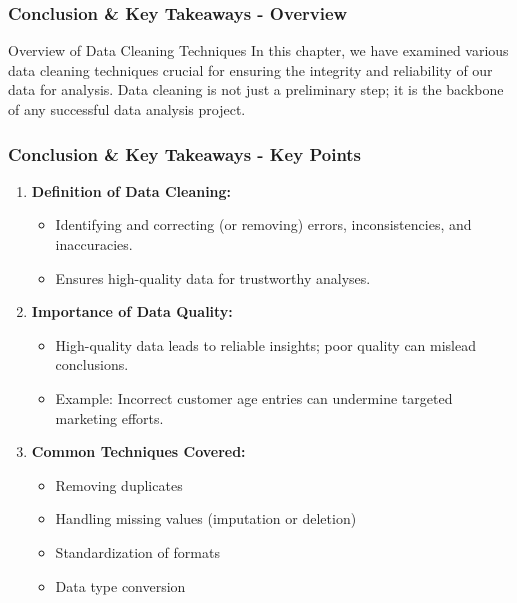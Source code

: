 \documentclass[aspectratio=169]{beamer}
\begin{document}
\begin{frame}[fragile]
    \frametitle{Conclusion \& Key Takeaways - Overview}
    \begin{block}{Overview of Data Cleaning Techniques}
        In this chapter, we have examined various data cleaning techniques crucial for ensuring the integrity and reliability of our data for analysis. Data cleaning is not just a preliminary step; it is the backbone of any successful data analysis project.
    \end{block}
\end{frame}

\begin{frame}[fragile]
    \frametitle{Conclusion \& Key Takeaways - Key Points}
    \begin{enumerate}
        \item \textbf{Definition of Data Cleaning:}
            \begin{itemize}
                \item Identifying and correcting (or removing) errors, inconsistencies, and inaccuracies.
                \item Ensures high-quality data for trustworthy analyses.
            \end{itemize}
        \item \textbf{Importance of Data Quality:}
            \begin{itemize}
                \item High-quality data leads to reliable insights; poor quality can mislead conclusions.
                \item Example: Incorrect customer age entries can undermine targeted marketing efforts.
            \end{itemize}
        \item \textbf{Common Techniques Covered:}
            \begin{itemize}
                \item Removing duplicates
                \item Handling missing values (imputation or deletion)
                \item Standardization of formats
                \item Data type conversion
            \end{itemize}
    \end{enumerate}
\end{frame}
\end{document}
